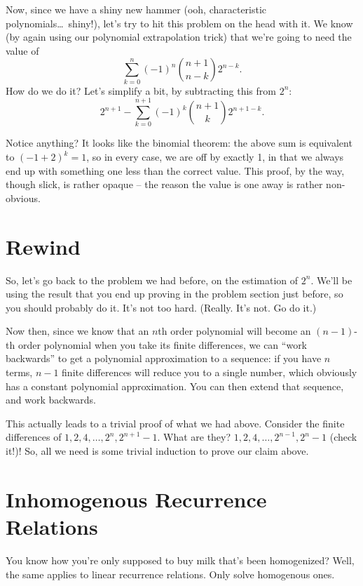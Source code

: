 \documentclass[12pt,letterpaper]{article}
\begin{document}
Now, since we have a shiny new hammer (ooh, characteristic polynomials\ldots\ shiny!), let's try
to hit this problem on the head with it. We know (by again using our polynomial
extrapolation trick) that we're going to need the value of
$$\sum_{k=0}^{n} (-1)^n \binom{n+1}{n-k} 2^{n-k}.$$ How do we do it? Let's simplify a bit, by
subtracting this from $2^n$: $$2^{n+1} - \sum_{k=0}^{n+1} (-1)^k \binom{n+1}{k} 2^{n+1-k}.$$

Notice anything? It looks like the binomial theorem: the above sum is equivalent to $(-1 + 2) ^ k = 1$,
so in every case, we are off by exactly 1, in that we always end up with something one less
than the correct value. This proof, by the way, though slick, is
rather opaque -- the reason the value is one away is rather non-obvious.

\section{Rewind}
So, let's go back to the problem we had before, on the estimation of
$2^n$. We'll be using the result that you end up proving in the
problem section just before, so you should probably do it. It's not
too hard. (Really. It's not. Go do it.)

Now then, since we know that an $n$th order polynomial will become
an $(n-1)$-th order polynomial when you take its finite differences, we can
``work backwards'' to get a polynomial approximation to a sequence: if
you have $n$ terms, $n-1$ finite differences will reduce you to a
single number, which obviously has a constant polynomial
approximation. You can then extend that sequence, and work backwards.

This actually leads to a trivial proof of what we had above. Consider
the finite differences of $1, 2, 4, \ldots, 2^n, 2^{n+1}-1$. What are they?
$1, 2, 4, \ldots, 2^{n-1}, 2^n-1$ (check it!)! So, all we need is some trivial
induction to prove our claim above.

\section{Inhomogenous Recurrence Relations}
You know how you're only supposed to buy milk that's been homogenized? Well, the
same applies to linear recurrence relations. Only solve homogenous ones.
\end{document}
